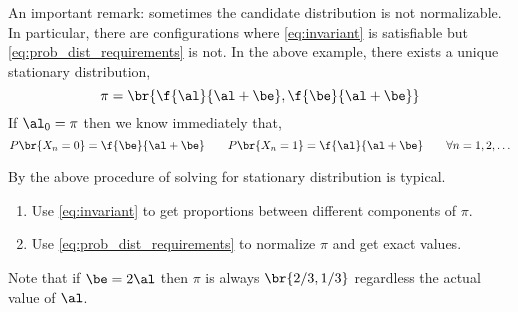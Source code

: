 \documentclass{article}
\begin{document}
An important remark: sometimes the candidate distribution is not normalizable. In particular, there are configurations where \cref{eq:invariant} is satisfiable but \cref{eq:prob_dist_requirements} is not. In the above example, there exists a unique stationary distribution,
\[ \pi = \br{\f{\al}{\al + \be} ,\f{\be}{\al + \be}} \]
If $\al_0 = \pi$ then we know immediately that,
\[ P\br{X_n = 0} = \f{\be}{\al+\be} \qquad P\br{X_n = 1} = \f{\al}{\al+\be} \qquad \forall n = 1, 2, \ldots\]
\begin{remark}
    By the above procedure of solving for stationary distribution is typical.
    \begin{enumerate}
        \item Use \cref{eq:invariant} to get proportions between different components of $\pi$.
        \item Use \cref{eq:prob_dist_requirements} to normalize $\pi$ and get exact values.
    \end{enumerate}
\end{remark}
\begin{remark}
    Note that if $\be = 2 \al$ then $\pi$ is always $\br{2/3, 1/3}$ regardless the actual value of $\al$.
\end{remark}
\end{document}
